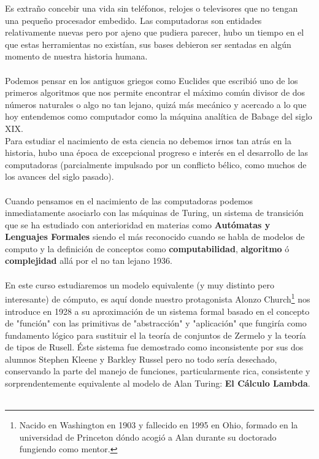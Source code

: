Es extraño concebir una vida sin teléfonos, relojes o televisores que no tengan una pequeño procesador embedido. Las computadoras son entidades relativamente nuevas pero por ajeno que pudiera parecer, hubo un tiempo en el que estas herramientas no existían, sus bases debieron ser sentadas en algún momento de nuestra historia humana. \\\\
Podemos pensar en los antiguos griegos como Euclides que escribió uno de los primeros algoritmos que nos permite encontrar el máximo común divisor de dos números naturales o algo no tan lejano, quizá más mecánico y acercado a lo que hoy entendemos como computador como la máquina analítica de Babage del siglo XIX. \\
Para estudiar el nacimiento de esta ciencia no debemos irnos tan atrás en la historia, hubo una época de excepcional progreso e interés en el desarrollo de las computadoras (parcialmente impulsado por un conflicto bélico, como muchos de los avances del siglo pasado). \\\\
Cuando pensamos en el nacimiento de las computadoras podemos inmediatamente asociarlo con las máquinas de Turing, un sistema de transición que se ha estudiado con anterioridad en materias como \textbf{Autómatas y Lenguajes Formales} siendo el más reconocido cuando se habla de modelos de computo y la definición de conceptos como \textbf{computabilidad}, \textbf{algoritmo} ó \textbf{complejidad} allá por el no tan lejano 1936.\\\\
En este curso estudiaremos un modelo equivalente (y muy distinto pero interesante) de cómputo, es aquí donde nuestro protagonista Alonzo Church\footnote{Nacido en Washington en 1903 y fallecido en 1995 en Ohio, formado en la universidad de Princeton dóndo acogió a Alan durante su doctorado fungiendo como mentor.} nos introduce en 1928 a su aproximación de un sistema formal basado en el concepto de "función" con las primitivas de "abstracción" y "aplicación" que fungiría como fundamento lógico para sustituir el la teoría de conjuntos de Zermelo y la teoría de tipos de Rusell. Éste sistema fue demostrado como inconsistente por sus dos alumnos Stephen Kleene y Barkley Russel pero no todo sería desechado, conservando la parte del manejo de funciones, particularmente rica, consistente y sorprendentemente equivalente al modelo de Alan Turing: \textbf{El Cálculo Lambda}.\\\\


